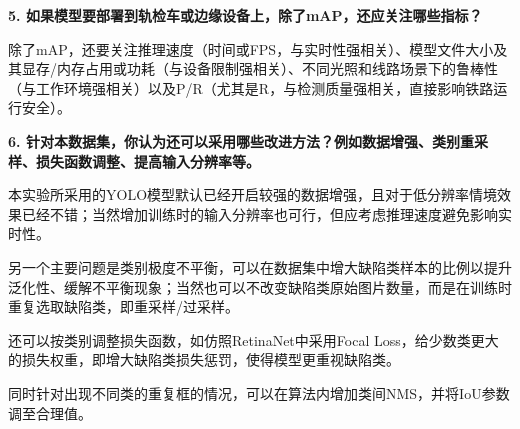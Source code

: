 \documentclass[12pt, oneside, a4paper]{ctexart}
\begin{document}
\par{}
\noindent\textbf{\heiti{}5. 如果模型要部署到轨检车或边缘设备上，除了mAP，还应关注哪些指标？}
\par{}
除了mAP，还要关注推理速度（时间或FPS，与实时性强相关）、模型文件大小及其显存/内存占用或功耗（与设备限制强相关）、不同光照和线路场景下的鲁棒性（与工作环境强相关）以及P/R（尤其是R，与检测质量强相关，直接影响铁路运行安全）。
\par{}
\noindent\textbf{\heiti{}6. 针对本数据集，你认为还可以采用哪些改进方法？例如数据增强、类别重采样、损失函数调整、提高输入分辨率等。}
\par{}
本实验所采用的YOLO模型默认已经开启较强的数据增强，且对于低分辨率情境效果已经不错；当然增加训练时的输入分辨率也可行，但应考虑推理速度避免影响实时性。
\par{}
另一个主要问题是类别极度不平衡，可以在数据集中增大缺陷类样本的比例以提升泛化性、缓解不平衡现象；当然也可以不改变缺陷类原始图片数量，而是在训练时重复选取缺陷类，即重采样/过采样。
\par{}
还可以按类别调整损失函数，如仿照RetinaNet中采用Focal Loss，给少数类更大的损失权重，即增大缺陷类损失惩罚，使得模型更重视缺陷类。
\par{}
同时针对出现不同类的重复框的情况，可以在算法内增加类间NMS，并将IoU参数调至合理值。
\par{}
\quad{}
\par{}
\end{document}
